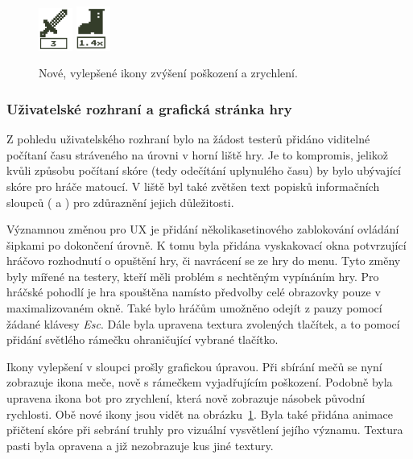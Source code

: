 \begin{figure}[ht]
    \centering
    \includegraphics[width=0.1\textwidth]{obrazky-figures/ch5/new_demage.png}\hspace{3cm}
    \includegraphics[width=0.1\textwidth]{obrazky-figures/ch5/new_speed.png}
    \caption{Nové, vylepšené ikony zvýšení poškození a zrychlení.}
    \label{fig:new_icons}
\end{figure}


\subsubsection*{\textbullet Uživatelské rozhraní a grafická stránka hry}
Z pohledu uživatelského rozhraní bylo na žádost testerů přidáno viditelné počítaní času stráveného na úrovni v horní liště hry. Je to kompromis, jelikož kvůli způsobu počítaní skóre (tedy odečítání uplynulého času) by bylo ubývající skóre pro hráče matoucí. V liště byl také zvětšen text popisků informačních sloupců ( a ) pro zdůraznění jejich důležitosti.

Významnou změnou pro UX je přidání několikasetinového zablokování ovládání šipkami po dokončení úrovně. K tomu byla přidána vyskakovací okna potvrzující hráčovo rozhodnutí o opuštění hry, či navrácení se ze hry do menu. Tyto změny byly mířené na testery, kteří měli problém s nechtěným vypínáním hry. Pro hráčské pohodlí je hra spouštěna namísto předvolby celé obrazovky pouze v maximalizovaném okně. Také bylo hráčům umožněno odejít z pauzy pomocí žádané klávesy \textit{Esc}. Dále byla upravena textura zvolených tlačítek, a to pomocí přidání světlého rámečku ohraničující vybrané tlačítko.

Ikony vylepšení v sloupci  prošly grafickou úpravou. Při sbírání mečů se nyní zobrazuje ikona meče, nově s rámečkem vyjadřujícím poškození. Podobně byla upravena ikona bot pro zrychlení, která nově zobrazuje násobek původní rychlosti. Obě nové ikony jsou vidět na obrázku~\ref{fig:new_icons}. Byla také přidána animace přičtení skóre při sebrání truhly pro vizuální vysvětlení jejího významu. Textura pasti byla opravena a již nezobrazuje kus jiné textury.


